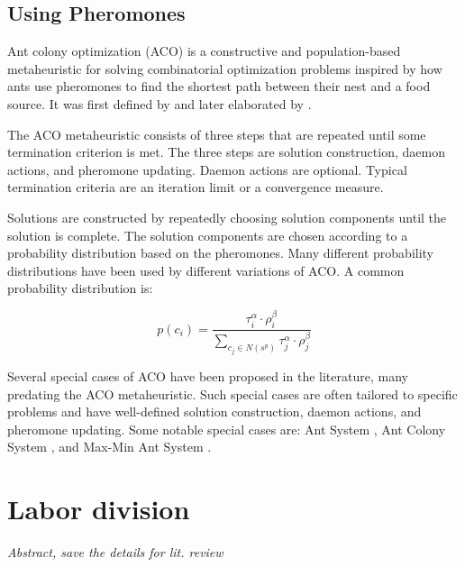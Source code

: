 \subsection{Using Pheromones}

Ant colony optimization (ACO) is a constructive and population-based metaheuristic for solving combinatorial optimization problems inspired by how ants use pheromones to find the shortest path between their nest and a food source. It was first defined by \textcite{Dorigo1999a} and later elaborated by \textcite{Dorigo1999,Dorigo2004}.

The ACO metaheuristic consists of three steps that are repeated until some termination criterion is met. The three steps are solution construction, daemon actions, and pheromone updating. Daemon actions are optional. Typical termination criteria are an iteration limit or a convergence measure.

Solutions are constructed by repeatedly choosing solution components until the solution is complete. The solution components are chosen according to a probability distribution based on the pheromones. Many different probability distributions have been used by different variations of ACO. A common probability distribution is:

\begin{equation}
p(c_i)=\frac{\tau_{i}^{\alpha} \cdot \rho_{i}^{\beta}}{\sum_{c_j \in N(s^p)} \tau_{j}^{\alpha} \cdot \rho_{j}^{\beta}}
\end{equation}

Several special cases of ACO have been proposed in the literature, many predating the ACO metaheuristic. Such special cases are often tailored to specific problems and have well-defined solution construction, daemon actions, and pheromone updating. Some notable special cases are: Ant System \parencite{Dorigo1996}, Ant Colony System \parencite{Dorigo1997}, and Max-Min Ant System \parencite{Stutzle1998,Stuetzle2000}.



\section{Labor division}
\emph{Abstract, save the details for lit. review}
